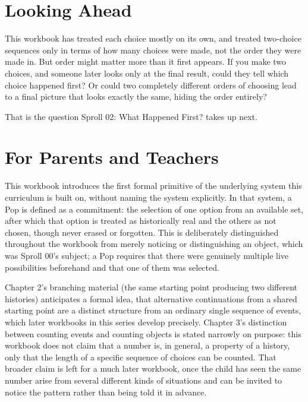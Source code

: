 \documentclass[11pt]{book}
\begin{document}
\chapter*{Looking Ahead}

This workbook has treated each choice mostly on its own, and treated two-choice sequences only in terms of how many choices were made, not the order they were made in. But order might matter more than it first appears. If you make two choices, and someone later looks only at the final result, could they tell which choice happened first? Or could two completely different orders of choosing lead to a final picture that looks exactly the same, hiding the order entirely?

That is the question Sproll 02: What Happened First? takes up next.

\chapter*{For Parents and Teachers}

This workbook introduces the first formal primitive of the underlying system this curriculum is built on, without naming the system explicitly. In that system, a Pop is defined as a commitment: the selection of one option from an available set, after which that option is treated as historically real and the others as not chosen, though never erased or forgotten. This is deliberately distinguished throughout the workbook from merely noticing or distinguishing an object, which was Sproll 00's subject; a Pop requires that there were genuinely multiple live possibilities beforehand and that one of them was selected.

Chapter 2's branching material (the same starting point producing two different histories) anticipates a formal idea, that alternative continuations from a shared starting point are a distinct structure from an ordinary single sequence of events, which later workbooks in this series develop precisely. Chapter 3's distinction between counting events and counting objects is stated narrowly on purpose: this workbook does not claim that a number is, in general, a property of a history, only that the length of a specific sequence of choices can be counted. That broader claim is left for a much later workbook, once the child has seen the same number arise from several different kinds of situations and can be invited to notice the pattern rather than being told it in advance.
\end{document}
